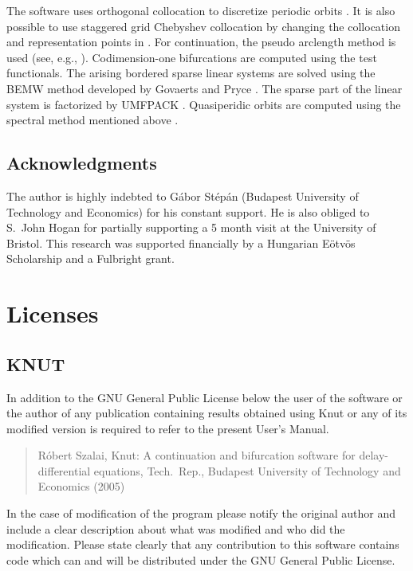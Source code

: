 \documentclass[10pt,a4paper]{ddedoc}
\def\knut{Knut}
\begin{document}
The software uses orthogonal collocation to discretize periodic orbits
\cite{engstab,engcol}. It is also possible to use staggered grid Chebyshev
collocation \cite{kopriva} by changing the collocation and representation points
in . For continuation, the pseudo arclength method is
used (see, e.g., \cite{handbook, tutorial1, tutorial2}). Codimension-one
bifurcations are computed using the test functionals. The arising bordered
sparse linear systems are solved using the BEMW method developed by Govaerts and
Pryce \cite{Gov1993}. The sparse part of the linear system is factorized by
UMFPACK \cite{umfpack}. Quasiperidic orbits are computed using the spectral
method mentioned above \cite{kopriva,roose-szalai}.

\subsection*{Acknowledgments}

The author is highly indebted to G\'abor St\'ep\'an (Budapest University of 
Technology and Economics) for his constant support. He is also
obliged to S.~John Hogan for partially supporting a 5 month visit at the
University of Bristol.
This research was supported financially by a Hungarian E\"otv\"os Scholarship
and a Fulbright grant.

\appendix

\section{Licenses}

\subsection{KNUT}

In addition to the GNU General Public License below the user of the software or
the author of any
publication containing results obtained using \knut{} or any of its modified
version is required to refer to the present User's Manual.
\begin{quote}
R\'obert Szalai, \knut{}: A continuation and bifurcation software for 
delay-differential equations, Tech.\ Rep., Budapest University of Technology
and Economics (2005)
\end{quote}
In the case of modification of the program please notify the original author and
include a clear description about what was modified and who did the 
modification. Please state clearly that any contribution to this software
contains code which can and will be distributed under the GNU General Public
License.
\end{document}
